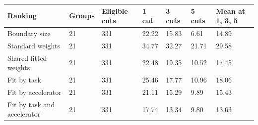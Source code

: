\begin{tabular}{@{}lllllll@{}}
\toprule
Ranking & Groups & Eligible cuts & 1 cut & 3 cuts & 5 cuts & Mean at 1, 3, 5 \\
\midrule
Boundary size & 21 & 331 & 22.22 & 15.83 & 6.61 & 14.89 \\
Standard weights & 21 & 331 & 34.77 & 32.27 & 21.71 & 29.58 \\
Shared fitted weights & 21 & 331 & 22.48 & 19.35 & 10.52 & 17.45 \\
Fit by task & 21 & 331 & 25.46 & 17.77 & 10.96 & 18.06 \\
Fit by accelerator & 21 & 331 & 21.11 & 15.29 & 9.89 & 15.43 \\
Fit by task and accelerator & 21 & 331 & 17.74 & 13.34 & 9.80 & 13.63 \\
\bottomrule
\end{tabular}
